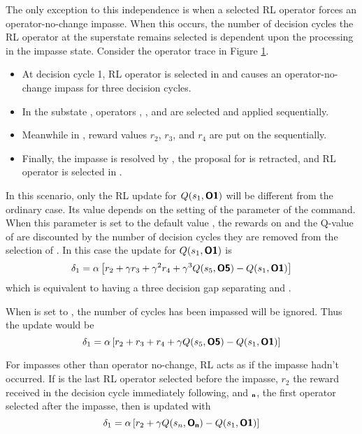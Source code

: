 The only exception to this independence is when a selected RL operator forces an operator-no-change impasse.
When this occurs, the number of decision cycles the RL operator at the superstate remains selected is dependent upon the processing in the impasse state.
Consider the operator trace in Figure \ref{fig:rl-optrace}.

\begin{itemize}
\item At decision cycle 1, RL operator  is selected in  and causes an operator-no-change impass for three decision cycles.
\item In the substate , operators , , and  are selected and applied sequentially.
\item Meanwhile in , reward values $r_2$, $r_3$, and $r_4$ are put on the  sequentially.
\item Finally, the impasse is resolved by , the proposal for  is retracted, and RL operator  is selected in .
\end{itemize}

\begin{figure}
\label{fig:rl-optrace}
\end{figure}

In this scenario, only the RL update for $Q(s_1, \textsf{\textbf{O1}})$ will be different from the ordinary case.
Its value depends on the setting of the  parameter of the  command.
When this parameter is set to the default value , the rewards on  and the Q-value of  are discounted by the number of decision cycles they are removed from the selection of .
In this case the update for $Q(s_1, \textsf{\textbf{O1}})$ is
$$\delta_1 = \alpha \left[ r_2 + \gamma r_3 + \gamma^2 r_4 + \gamma^3 Q(s_5, \textsf{\textbf{O5}}) - Q(s_1, \textsf{\textbf{O1}}) \right]$$
which is equivalent to having a three decision gap separating  and .

When  is set to , the number of cycles  has been impassed will be ignored.
Thus the update would be
$$\delta_1 = \alpha \left[ r_2 + r_3 + r_4 + \gamma Q(s_5, \textsf{\textbf{O5}}) - Q(s_1, \textsf{\textbf{O1}}) \right]$$

For impasses other than operator no-change, RL acts as if the impasse hadn't occurred.
If  is the last RL operator selected before the impasse, $r_2$ the reward received in the decision cycle immediately following, and $_{\textsf{\textbf{n}}}$, the first operator selected after the impasse, then  is updated with 
$$\delta_1 = \alpha \left[ r_2 + \gamma Q(s_n, \textsf{\textbf{O}}_{\textsf{\textbf{n}}}) - Q(s_1, \textsf{\textbf{O1}}) \right]$$

